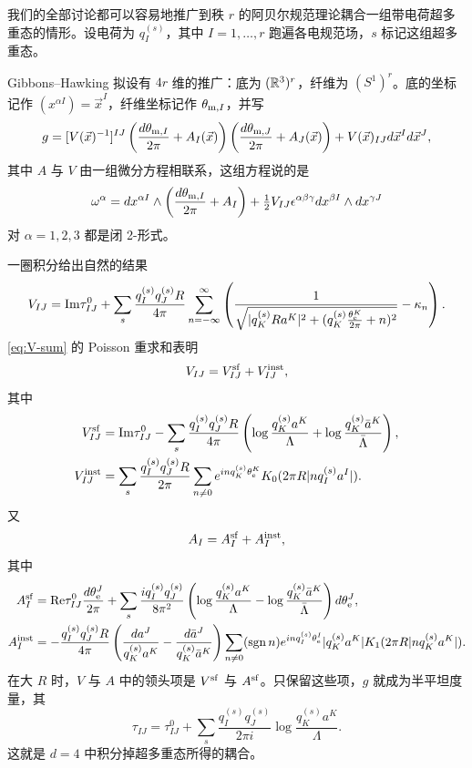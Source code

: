 我们的全部讨论都可以容易地推广到秩 $r$ 的阿贝尔规范理论耦合一组带电荷超多重态的情形。设电荷为 $q_I^{(s)}$，其中 $I=1, \dots, r$ 跑遍各电规范场，$s$ 标记这组超多重态。

Gibbons–Hawking 拟设有 $4r$ 维的推广：底为 $(\mathbb{R}^3)^r$，纤维为 $(S^1)^r$。底的坐标记作 $(x^{\alpha I}) = \vec x^I$，纤维坐标记作 $\theta_{\mathrm{m},I}$，并写
\begin{equation}
g = [V(\vec{x})^{-1}]^{IJ} \left(\frac{d \theta_{\mathrm{m},I}}{2\pi} +
A_I(\vec{x})\right)\left(\frac{d \theta_{\mathrm{m},J}}{2\pi} +
A_J(\vec{x})\right) + V(\vec{x})_{IJ} d\vec{x}^I d\vec{x}^J,
\end{equation}
其中 $A$ 与 $V$ 由一组微分方程相联系，这组方程说的是
\begin{equation}
\omega^{\alpha} = dx^{\alpha I} \wedge \left( \frac{d\theta_{\mathrm{m},I}}{2\pi} + A_I
\right) + \tfrac{1}{2} V_{IJ} \epsilon^{\alpha\beta\gamma} dx^{\beta I } \wedge
dx^{\gamma J}
\end{equation}
对 $\alpha = 1,2,3$ 都是闭 2-形式。

一圈积分给出自然的结果
\begin{equation}
\label{eq:V-sum-r} V_{IJ} =  \mathrm{Im} \tau^0_{IJ} + \sum_{s}
\frac{q^{(s)}_I q^{(s)}_J R}{4 \pi} \sum_{n=-\infty}^\infty \left(
\frac{1}{\sqrt{| q^{(s)}_K R a^K|^2 + (q^{(s)}_K \frac{\theta_{\mathrm{e}}^K}{2
\pi} + n)^2}} - \kappa_n \right).
\end{equation}
\eqref{eq:V-sum} 的 Poisson 重求和表明
\begin{equation}
V_{IJ} = V_{IJ}^{\mathrm{sf}} + V_{IJ}^{\mathrm{inst}},
\end{equation}
其中
\begin{align}
V_{IJ}^{\mathrm{sf}} &= \mathrm{Im} \tau^0_{IJ} - \sum_s \frac{q^{(s)}_I
q^{(s)}_J R}{4\pi} \left(\log  \frac{q^{(s)}_K a^K}{\Lambda} + \log \frac{q^{(s)}_K \bar{a}^K}{\bar{\Lambda}} \right), \\
V_{IJ}^{\mathrm{inst}} &= \sum_s \frac{q^{(s)}_I q^{(s)}_J R}{2\pi}
\sum_{n\neq 0} e^{i n q^{(s)}_K \theta_{\mathrm{e}}^K} K_0(2 \pi R \lvert n
q^{(s)}_I a^I \rvert). \label{eq:V-inst-r}
\end{align}
又
\begin{equation}
A_I = A_I^{\mathrm{sf}} + A_I^{\mathrm{inst}},
\end{equation}
其中
\begin{align}
A_I^{\mathrm{sf}} &= \mathrm{Re} \tau^0_{IJ} \frac{d \theta_{\mathrm{e}}^J}{2 \pi} + \sum_s
\frac{i q^{(s)}_I
q^{(s)}_J}{8 \pi^2} \left( \log \frac{q^{(s)}_K a^K}{\Lambda} - \log \frac{q^{(s)}_K \bar{a}^K}{\bar{\Lambda}} \right) d\theta_{\mathrm{e}}^J, \label{eq:A0-rankr} \\
A_I^{\mathrm{inst}} &=  - \frac{q^{(s)}_I q^{(s)}_J R}{4 \pi} \left(
\frac{da^J}{q^{(s)}_K a^K} - \frac{d\bar a^J}{q^{(s)}_K \bar a^K}
\right) \sum_{n \neq 0} (\operatorname{sgn} n) e^{i n q^{(s)}_I \theta_{\mathrm{e}}^I}
\lvert q^{(s)}_K a^K \rvert K_1(2 \pi R \lvert n q^{(s)}_K a^K \rvert).
\label{eq:A-inst-rankr}
\end{align}
在大 $R$ 时，$V$ 与 $A$ 中的领头项是 $V^{\mathrm{sf}}$ 与 $A^{\mathrm{sf}}$。只保留这些项，$g$ 就成为半平坦度量，其
\begin{equation}
\tau_{IJ} =\tau^0_{IJ} + \sum_s \frac{q^{(s)}_I q^{(s)}_J}{2 \pi i}
\log \frac{q^{(s)}_K a^K}{\Lambda}.
\end{equation}
这就是 $d=4$ 中积分掉超多重态所得的耦合。

